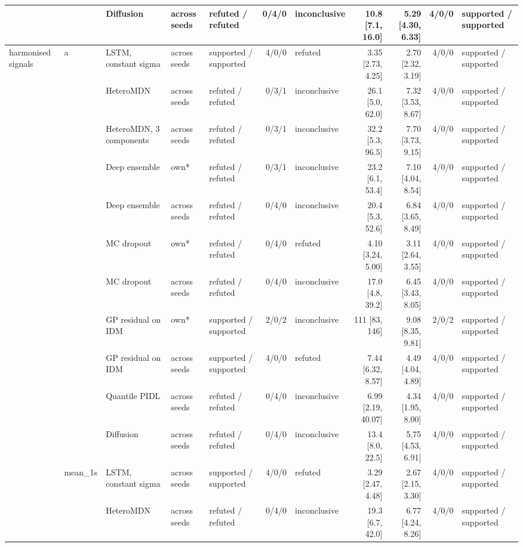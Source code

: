 \begin{longtable}{lllllrlrrrl}
 &  & Diffusion & across seeds & refuted / refuted & 0/4/0 & inconclusive & 10.8 [7.1, 16.0] & 5.29 [4.30, 6.33] & 4/0/0 & supported / supported \\
\midrule
harmonised signals & a & LSTM, constant sigma & across seeds & supported / supported & 4/0/0 & refuted & 3.35 [2.73, 4.25] & 2.70 [2.32, 3.19] & 4/0/0 & supported / supported \\
 &  & HeteroMDN & across seeds & refuted / refuted & 0/3/1 & inconclusive & 26.1 [5.0, 62.0] & 7.32 [3.53, 8.67] & 4/0/0 & supported / supported \\
 &  & HeteroMDN, 3 components & across seeds & refuted / refuted & 0/3/1 & inconclusive & 32.2 [5.3, 96.5] & 7.70 [3.73, 9.15] & 4/0/0 & supported / supported \\
 &  & Deep ensemble & own* & refuted / refuted & 0/3/1 & inconclusive & 23.2 [6.1, 53.4] & 7.10 [4.04, 8.54] & 4/0/0 & supported / supported \\
 &  & Deep ensemble & across seeds & refuted / refuted & 0/4/0 & inconclusive & 20.4 [5.3, 52.6] & 6.84 [3.65, 8.49] & 4/0/0 & supported / supported \\
 &  & MC dropout & own* & refuted / refuted & 0/4/0 & refuted & 4.10 [3.24, 5.00] & 3.11 [2.64, 3.55] & 4/0/0 & supported / supported \\
 &  & MC dropout & across seeds & refuted / refuted & 0/4/0 & inconclusive & 17.0 [4.8, 39.2] & 6.45 [3.43, 8.05] & 4/0/0 & supported / supported \\
 &  & GP residual on IDM & own* & supported / supported & 2/0/2 & inconclusive & 111 [83, 146] & 9.08 [8.35, 9.81] & 2/0/2 & supported / supported \\
 &  & GP residual on IDM & across seeds & supported / supported & 4/0/0 & refuted & 7.44 [6.32, 8.57] & 4.49 [4.04, 4.89] & 4/0/0 & supported / supported \\
 &  & Quantile PIDL & across seeds & refuted / refuted & 0/4/0 & inconclusive & 6.99 [2.19, 40.07] & 4.34 [1.95, 8.00] & 4/0/0 & supported / supported \\
 &  & Diffusion & across seeds & refuted / refuted & 0/4/0 & inconclusive & 13.4 [8.0, 22.5] & 5.75 [4.53, 6.91] & 4/0/0 & supported / supported \\
\midrule
 & mean\_1s & LSTM, constant sigma & across seeds & supported / supported & 4/0/0 & refuted & 3.29 [2.47, 4.48] & 2.67 [2.15, 3.30] & 4/0/0 & supported / supported \\
 &  & HeteroMDN & across seeds & refuted / refuted & 0/4/0 & inconclusive & 19.3 [6.7, 42.0] & 6.77 [4.24, 8.26] & 4/0/0 & supported / supported \\

\end{longtable}
